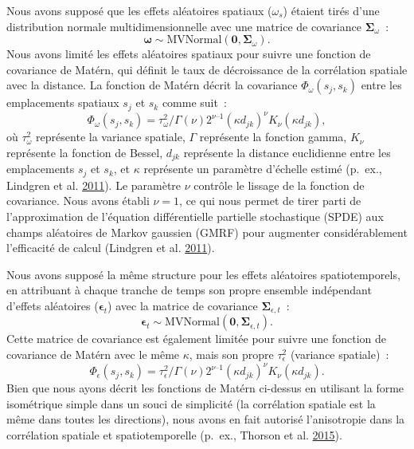 \documentclass[french,11pt]{book}
\begin{document}
Nous avons supposé que les effets aléatoires spatiaux (\(\omega_s\)) étaient tirés d'une distribution normale multidimensionnelle avec une matrice de covariance \(\bm{\Sigma}_\omega\)~:
\begin{equation}
\bm{\omega} \sim \mathrm{MVNormal} \left( \bm{0}, \bm{\Sigma}_\omega \right).
\end{equation}
Nous avons limité les effets aléatoires spatiaux pour suivre une fonction de covariance de \mbox{Mat\'ern}, qui définit le taux de décroissance de la corrélation spatiale avec la distance. La fonction de \mbox{Mat\'ern} décrit la covariance \(\Phi_\omega \left( s_j, s_k \right)\) entre les emplacements spatiaux \(s_j\) et \(s_k\) comme suit~:
\begin{equation}
\Phi_\omega\left( s_j,s_k \right) = \tau_\omega^2/\Gamma(\nu)2^{\nu – 1}
    (\kappa d_{jk})^\nu K_\nu \left( \kappa d_{jk} \right),
\end{equation}
où \(\tau_\omega^2\) représente la variance spatiale, \(\Gamma\) représente la fonction gamma, \(K_\nu\) représente la fonction de Bessel, \(d_{jk}\) représente la distance euclidienne entre les emplacements \(s_j\) et \(s_k\), et \(\kappa\) représente un paramètre d'échelle estimé (p.~ex., Lindgren et al. \protect\hyperlink{ref-lindgren2011}{2011}). Le paramètre \(\nu\) contrôle le lissage de la fonction de covariance. Nous avons établi \(\nu = 1\), ce qui nous permet de tirer parti de l'approximation de l'équation différentielle partielle stochastique (SPDE) aux champs aléatoires de Markov gaussien (GMRF) pour augmenter considérablement l'efficacité de calcul (Lindgren et al. \protect\hyperlink{ref-lindgren2011}{2011}).

Nous avons supposé la même structure pour les effets aléatoires spatiotemporels, en attribuant à chaque tranche de temps son propre ensemble indépendant d'effets aléatoires (\(\bm{\epsilon}_t\)) avec la matrice de covariance \(\bm{\Sigma}_{\epsilon,t}\)~:
\begin{equation}
\bm{\epsilon}_t \sim \mathrm{MVNormal} \left( \bm{0}, \bm{\Sigma}_{\epsilon,t} \right).
\end{equation}
Cette matrice de covariance est également limitée pour suivre une fonction de covariance de \mbox{Mat\'ern} avec le même \(\kappa\), mais son propre \(\tau_\epsilon^2\) (variance spatiale)~:
\begin{equation}
\Phi_\epsilon\left( s_j,s_k \right) = \tau_\epsilon^2/\Gamma(\nu)2^{\nu – 1}
    (\kappa d_{jk})^\nu K_\nu \left( \kappa d_{jk} \right).
\end{equation}
Bien que nous ayons décrit les fonctions de \mbox{Mat\'ern} ci-dessus en utilisant la forme isométrique simple dans un souci de simplicité (la corrélation spatiale est la même dans toutes les directions), nous avons en fait autorisé l'anisotropie dans la corrélation spatiale et spatiotemporelle (p.~ex., Thorson et al. \protect\hyperlink{ref-thorson2015}{2015}).
\end{document}
